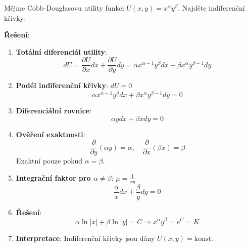 \begin{example}
Mějme Cobb-Douglasovu utility funkci $U(x, y) = x^\alpha y^\beta$. Najděte indiferenční křivky.
\vspace{0.3\baselineskip}

\textbf{Řešení}:
\begin{enumerate}
\item \textbf{Totální diferenciál utility}:
\[
dU = \frac{\partial U}{\partial x}dx + \frac{\partial U}{\partial y}dy = \alpha x^{\alpha-1}y^\beta dx + \beta x^\alpha y^{\beta-1} dy
\]

\item \textbf{Podél indiferenční křivky}: $dU = 0$
\[
\alpha x^{\alpha-1}y^\beta dx + \beta x^\alpha y^{\beta-1} dy = 0
\]

\item \textbf{Diferenciální rovnice}:
\[
\alpha y dx + \beta x dy = 0
\]

\item \textbf{Ověření exaktnosti}:
\[
\frac{\partial}{\partial y}(\alpha y) = \alpha, \quad \frac{\partial}{\partial x}(\beta x) = \beta
\]
Exaktní pouze pokud $\alpha = \beta$.

\item \textbf{Integrační faktor pro $\alpha \neq \beta$}: $\mu = \frac{1}{xy}$
\[
\frac{\alpha}{x} dx + \frac{\beta}{y} dy = 0
\]

\item \textbf{Řešení}:
\[
\alpha \ln|x| + \beta \ln|y| = C \Rightarrow x^\alpha y^\beta = e^C = K
\]

\item \textbf{Interpretace}: Indiferenční křivky jsou dány $U(x, y) = \text{konst}$.
\end{enumerate}
\end{example}

\vspace{0.6\baselineskip}

